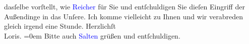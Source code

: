                     dasſelbe vorſtellt, wie \textcolor{blue}{Reicher}{}\ledrightnote{\textcolor{blue}{Emanuel Reicher}} für Sie und
                    entſchuldigen Sie dieſen Eingriff der Außendinge in das Unſere. Ich komme
                    vielleicht \label{K_L00085_1v}\label{K_L00085_1h} zu Ihnen und wir verabreden gleich irgend eine Stunde.\pend
           \pstart
           Herzlichſt{\\[\baselineskip]}\spacefill\mbox{Loris.}\pend
           \leftskip=0em{}\pstart
           \noindent{}Bitte auch \textcolor{blue}{Salten}{}\ledrightnote{\textcolor{blue}{Felix Salten}} grüßen und
                        entſchuldigen.\pend
           \endnumbering{}  
      